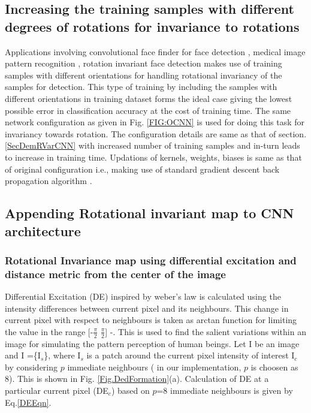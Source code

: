 \subsection{Increasing the training samples with different degrees of rotations for invariance to rotations}
\label{ORCNNConfg}
Applications involving convolutional face finder for face detection \cite{RCNN21}, medical image pattern recognition \cite{RCNN22}, rotation invariant face detection \cite{RCNN23} makes use of training samples with different orientations for handling rotational invariancy of the samples for detection. This type of training by including the samples with different orientations in training dataset forms the ideal case giving the lowest possible error in classification accuracy at the cost of training time. The same network configuration as given in Fig. \ref{FIG:OCNN} is used for doing this task for invariancy towards rotation. The configuration details are same as that of section. \ref{SecDemRVarCNN} with increased number of training samples and in-turn leads to increase in training time. Updations of kernels, weights, biases is same as that of original configuration i.e., making use of standard gradient descent back propagation algorithm \cite{P14} \cite{RCNN15}.\\

\subsection{Appending Rotational invariant map to CNN architecture}
\label{RCNNConfig}
\subsubsection{Rotational Invariance map using differential excitation and distance metric from the center of the image}
\label{SecDiffExcDistMap}
\label{RCNNConfiga}

Differential Excitation (DE) inspired by weber's law \cite{RCNN30} is calculated using the intensity differences between current pixel and its neighbours. This change in current pixel with respect to neighbours is taken as arctan function for limiting the value in the range [-$ \frac{\pi}{2} $  $ \frac{\pi}{2}$] \cite{RCNN31}-\cite{RCNN33}. This is used to find the salient variations within an image for simulating the pattern perception of human beings. Let I be an image and I =\{I$_s$\}, where I$_s$ is a patch around the current pixel intensity of interest I$_c$ by considering $p$ immediate neighbours ( in our implementation, $p$ is choosen as 8). This is shown in Fig. \ref{Fig.DedFormation}(a). Calculation of DE at a particular current pixel (DE$_c$) based on $p$=8 immediate neighbours is given by Eq.\ref{DEEqn}. \\

